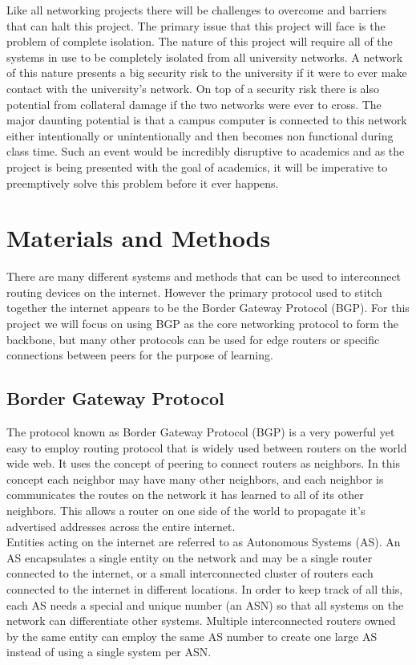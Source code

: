 \documentclass[12pt]{article}
\begin{document}
Like all networking projects there will be challenges to overcome and barriers that can halt this project. The primary issue that this
project will face is the problem of complete isolation. The nature of this project will require all of the systems in use to be
completely isolated from all university networks. A network of this nature presents a big security risk to the university if it were 
to ever make contact with the university's network. On top of a security risk there is also potential from collateral damage if the
two networks were ever to cross. The major daunting potential is that a campus computer is connected to this network either intentionally or
unintentionally and then becomes non functional during class time. Such an event would be incredibly disruptive to academics and as the project
is being presented with the goal of academics, it will be imperative to preemptively solve this problem before it ever happens.  

\section{Materials and Methods}

There are many different systems and methods that can be used to interconnect routing devices on the internet. 
However the primary protocol used to stitch together the internet appears to be the Border Gateway Protocol (BGP).
For this project we will focus on using BGP as the core networking protocol to form the backbone, but many other protocols can be 
used for edge routers or specific connections between peers for the purpose of learning.


\subsection{Border Gateway Protocol}

The protocol known as Border Gateway Protocol (BGP) is a very powerful yet easy to employ routing protocol that
is widely used between routers on the world wide web. It uses the concept of peering to connect routers as neighbors.
In this concept each neighbor may have many other neighbors, and each neighbor is communicates the routes on the network
it has learned to all of its other neighbors. This allows a router on one side of the world to propagate it's advertised
addresses across the entire internet.
\\

Entities acting on the internet are referred to as Autonomous Systems (AS). An AS encapsulates a single entity on the network
and may be a single router connected to the internet, or a small interconnected cluster of routers each connected to the internet
in different locations. In order to keep track of all this, each AS needs a special and unique number (an ASN) so that all systems on the network
can differentiate other systems. Multiple interconnected routers owned by the same entity can employ the same AS number to create one
large AS instead of using a single system per ASN.
\\
\end{document}
